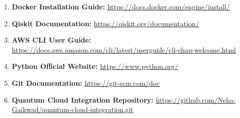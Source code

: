 \documentclass[conference]{IEEEtran}
\begin{document}


\begin{enumerate}
    \item \textbf{Docker Installation Guide:} \url{https://docs.docker.com/engine/install/}
    \item \textbf{Qiskit Documentation:} \url{https://qiskit.org/documentation/}
    \item \textbf{AWS CLI User Guide:} \url{https://docs.aws.amazon.com/cli/latest/userguide/cli-chap-welcome.html}
    \item \textbf{Python Official Website:} \url{https://www.python.org/}
    \item \textbf{Git Documentation:} \url{https://git-scm.com/doc}
    \item \textbf{Quantum Cloud Integration Repository:} \url{https://github.com/Neha-Gaikwad/quantum-cloud-integration.git}
\end{enumerate}
\end{document}
